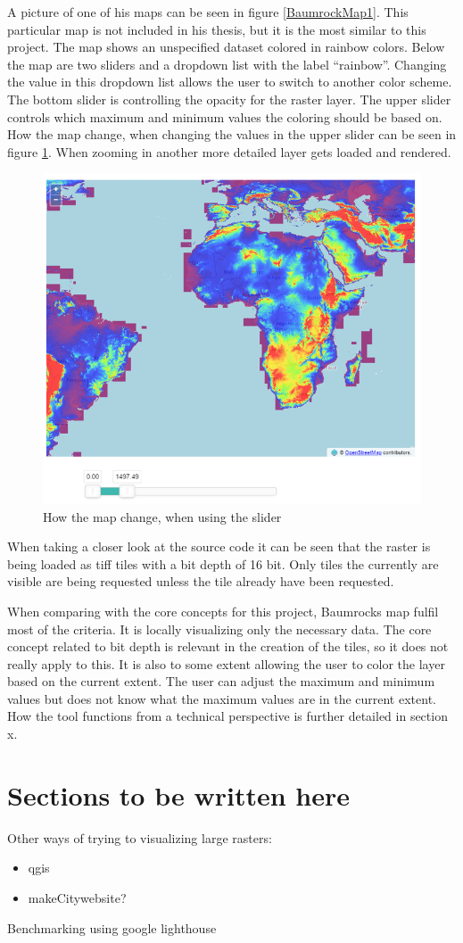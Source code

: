 A picture of one of his maps can be seen in figure \ref{BaumrockMap1}. This particular map is not included in his thesis, but it is the most similar to this project. The map shows an unspecified dataset colored in rainbow colors. Below the map are two sliders and a dropdown list with the label “rainbow”. Changing the value in this dropdown list allows the user to switch to another color scheme. The bottom slider is controlling the opacity for the raster layer. The upper slider controls which maximum and minimum values the coloring should be based on. How the map change, when changing the values in the upper slider can be seen in figure \ref{BaumrockMap2}. When zooming in another more detailed layer gets loaded and rendered.
\begin{figure} [H]
	\centering
	\includegraphics[width=.8\textwidth]{Pictures/BaumrockMap2}
	\caption{How the map change, when using the slider}
	\label{BaumrockMap2}
\end{figure}



When taking a closer look at the source code it can be seen that the raster is being loaded as tiff tiles with a bit depth of 16 bit. \citep{BuamrocksSouce} Only tiles the currently are visible are being requested unless the tile already have been requested. \citep{Buamrocks}

When comparing with the core concepts for this project, Baumrocks map fulfil most of the criteria. It is locally visualizing only the necessary data. The core concept related to bit depth is relevant in the creation of the tiles, so it does not really apply to this. 
It is also to some extent allowing the user to color the layer based on the current extent. The user can adjust the maximum and minimum values but does not know what the maximum values are in the current extent. 
How the tool functions from a technical perspective is further detailed in section x.

\section{Sections to be written here} 

Other ways of trying to visualizing large rasters:

\begin{itemize}
	\item qgis
	\item makeCitywebsite?
\end{itemize}

Benchmarking using google lighthouse